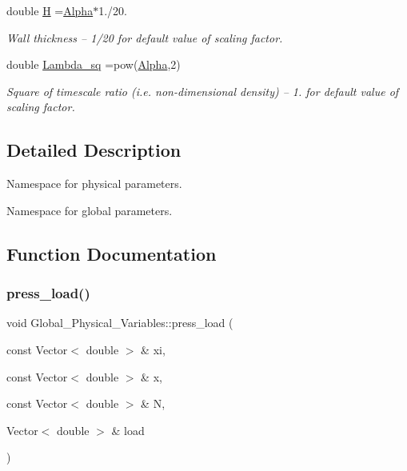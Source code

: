 \begin{DoxyCompactItemize}
double \hyperlink{namespaceGlobal__Physical__Variables_af6e07423e22c0991084d9a2f43727805}{H} =\hyperlink{namespaceGlobal__Physical__Variables_aa2e802ee7cc8e1ac900ba94c3ce86eb7}{Alpha}$\ast$1./20.
\begin{DoxyCompactList}\small\item\em Wall thickness -- 1/20 for default value of scaling factor. \end{DoxyCompactList}\item 
double \hyperlink{namespaceGlobal__Physical__Variables_a6fe17557ceb32dd353827fba60408363}{Lambda\+\_\+sq} =pow(\hyperlink{namespaceGlobal__Physical__Variables_aa2e802ee7cc8e1ac900ba94c3ce86eb7}{Alpha},2)
\begin{DoxyCompactList}\small\item\em Square of timescale ratio (i.\+e. non-\/dimensional density) -- 1. for default value of scaling factor. \end{DoxyCompactList}\end{DoxyCompactItemize}


\subsection{Detailed Description}
Namespace for physical parameters. 

Namespace for global parameters. 

\subsection{Function Documentation}
\mbox{\label{namespaceGlobal__Physical__Variables_a86fd8f502cb8c4c7939ffae742f023eb}} 
\subsubsection{\texorpdfstring{press\+\_\+load()}{press\_load()}}
{\footnotesize\ttfamily void Global\+\_\+\+Physical\+\_\+\+Variables\+::press\+\_\+load (\begin{DoxyParamCaption}\item[{const Vector$<$ double $>$ \&}]{xi,  }\item[{const Vector$<$ double $>$ \&}]{x,  }\item[{const Vector$<$ double $>$ \&}]{N,  }\item[{Vector$<$ double $>$ \&}]{load }\end{DoxyParamCaption})}



